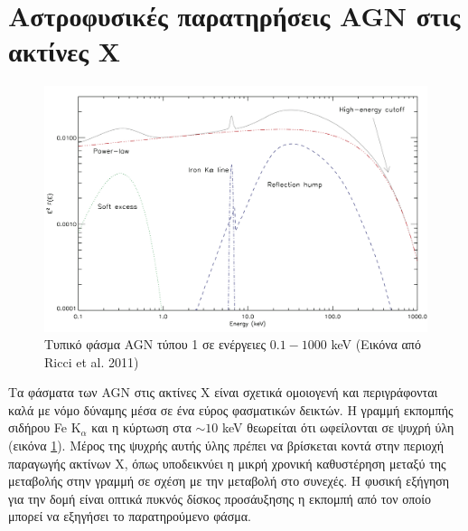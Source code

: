 \section{Αστροφυσικές παρατηρήσεις \textlatin{AGN} στις ακτίνες Χ}
\begin{figure}
 \begin{center}
 \includegraphics[width=0.9\linewidth]{Figures/X-ray_spectrum_AGN_hres.jpg}
 \caption{Τυπικό φάσμα \textlatin{AGN} τύπου 1 σε ενέργειες $0.1-1000$ \textlatin{keV} (Εικόνα από \textlatin{Ricci et al. 2011})} \label{fig:agnspec}
 \end{center}
\end{figure}
Τα φάσματα των \textlatin{AGN} στις ακτίνες Χ είναι σχετικά ομοιογενή και περιγράφονται καλά με νόμο δύναμης μέσα σε ένα εύρος φασματικών δεικτών. Η γραμμή εκπομπής σιδήρου \textlatin{Fe K$_\alpha$} και η κύρτωση στα $\sim 10$ \textlatin{keV} θεωρείται ότι ωφείλονται σε ψυχρή ύλη (εικόνα \ref{fig:agnspec}). Μέρος της ψυχρής αυτής ύλης πρέπει να βρίσκεται κοντά στην περιοχή παραγωγής ακτίνων Χ, όπως υποδεικνύει η μικρή χρονική καθυστέρηση μεταξύ της μεταβολής στην γραμμή σε σχέση με την μεταβολή στο συνεχές. Η φυσική εξήγηση για την δομή είναι οπτικά πυκνός δίσκος προσάυξησης η εκπομπή από τον οποίο μπορεί να εξηγήσει το παρατηρούμενο φάσμα\cite{1991ApJ}.
